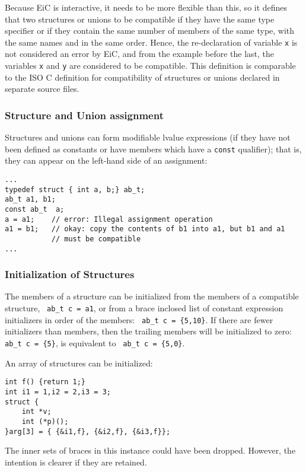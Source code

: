Because EiC is interactive, it needs to be more flexible than this, so
it defines that two structures or unions to be compatible if they have
the same type specifier or if they contain the same number of members 
of the same type, with the same names and in the same order. Hence,
the re-declaration of variable {\tt x} is not considered an error by
EiC, and from the example before the last, the variables {\tt x} and
{\tt y} are considered to be compatible. This definition is comparable
to the ISO C definition for compatibility of structures or unions
declared in separate source files.

\subsubsection{Structure and Union assignment}

Structures and unions can form modifiable lvalue expressions (if they
have not been defined as constants or have members which have a {\tt const}
qualifier); that is, they can appear on the left-hand side of an
assignment:
\begin{production}
\begin{verbatim}
...
typedef struct { int a, b;} ab_t;
ab_t a1, b1;
const ab_t  a;
a = a1;    // error: Illegal assignment operation
a1 = b1;   // okay: copy the contents of b1 into a1, but b1 and a1 
           // must be compatible
...
\end{verbatim}
\end{production}

\subsubsection{Initialization of Structures}
\label{sec:InitStruct}

The members of a structure can be initialized from the members of a
compatible structure, \verb+ ab_t c = a1+, or from a brace inclosed
list of constant expression initializers in order of the members:
\verb+ ab_t c = {5,10}+.  If there are fewer initializers than members,
then the trailing members will be initialized to zero: \verb+ ab_t c = {5}+, 
is equivalent to \verb+ ab_t c = {5,0}+.

An array of structures can be initialized:

\begin{production}
\begin{verbatim}
int f() {return 1;}
int i1 = 1,i2 = 2,i3 = 3;
struct {
    int *v;
    int (*p)();
}arg[3] = { {&i1,f}, {&i2,f}, {&i3,f}};
\end{verbatim}
\end{production}
 The inner sets of braces in this instance could have been
dropped. However, the intention is clearer if they are retained.



